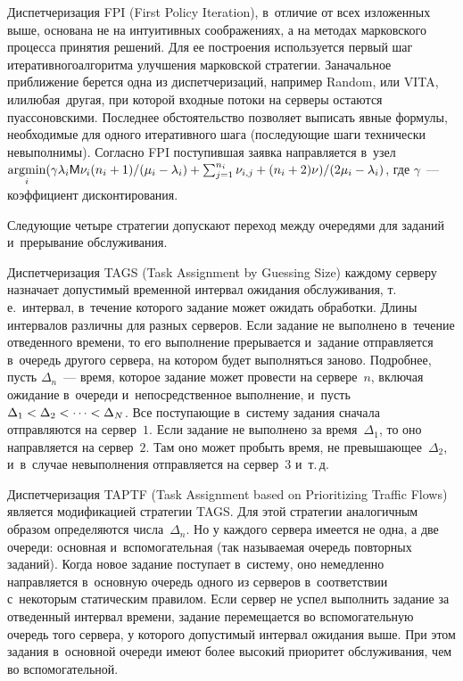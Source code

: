 \begin{multicols}{2}
    Диспетчеризация FPI (First Policy Iteration), в~отличие от всех изложенных выше, 
основана не на интуитивных соображениях, а на методах марковского процесса принятия 
решений. Для ее построения используется первый шаг итеративного\linebreak алгоритма 
улучшения марковской стратегии. За\linebreak начальное приближение берется одна из 
диспетчеризаций, например Random, или VITA, или\linebreak любая~дру\-гая, при которой входные 
потоки на серверы остаются пуассоновскими. Последнее об\-стоя\-тельство позволяет 
выписать явные формулы, необходимые для одного итеративного шага (по\-сле\-ду\-ющие 
шаги технически невыполнимы). Согласно FPI поступившая заявка направляется в~узел
    $\mathop{\mathrm{argmin}}\limits_i  
    (\gamma\lambda_i {\sf 
M}\nu_i(n_i+1)/(\mu_i-\lambda_i)\hm+\sum_{j=1}^{n_i} \nu_{i,j}\hm+ 
(n_i\hm+2)\nu)/(2\mu_i\hm-\lambda_i)$,
где $\gamma$~--- коэффициент дисконтирования.

    Следующие четыре стратегии допускают переход между очередями для заданий 
и~прерывание обслуживания.
    
    Диспетчеризация TAGS (Task Assignment by Guessing Size) каждому серверу 
назначает допустимый временной интервал ожидания обслуживания, т.\,е.\ интервал, 
в~течение которого задание может ожидать обработки. Длины интервалов различны для 
разных серверов. Если задание не выполнено в~течение отведенного времени, то его 
выполнение прерывается и~задание отправляется в~очередь другого сервера, на котором 
будет выполняться заново. Подробнее, пусть $\Delta_n$~--- время, которое задание может 
провести на сервере~$n$, включая ожидание в~очереди и~непосредственное выполнение, 
и~пусть $\Delta_1\hm< \Delta_2<\cdots < \Delta_N$. Все поступающие в~сис\-те\-му задания 
сначала отправляются на сервер~$1$. Если задание не выполнено за время~$\Delta_1$, то 
оно на\-прав\-ля\-ет\-ся на сервер~$2$. Там оно может пробыть время, не 
превышающее~$\Delta_2$, и~в~случае невыполнения отправляется на сервер~$3$ и~т.\,д.
    
    Диспетчеризация TAPTF (Task Assignment based on Prioritizing Traffic Flows) является 
модификацией стратегии TAGS. Для этой стратегии аналогичным образом определяются 
числа~$\Delta_n$. Но у каждого сервера имеется не одна, а две очереди: основная 
и~вспомогательная (так называемая очередь повторных заданий). Когда новое задание поступает 
в~сис\-те\-му, оно немедленно направляется в~основную очередь одного из серверов 
в~соответствии с~некоторым статическим правилом. Если сервер не успел выполнить 
задание за отведенный интервал времени, задание перемещается во вспомогательную 
очередь того сервера, у которого допустимый интервал ожидания выше. При этом задания 
в~основной очереди имеют более высокий приоритет обслуживания, чем во 
вспомогательной.
    

\end{multicols}
